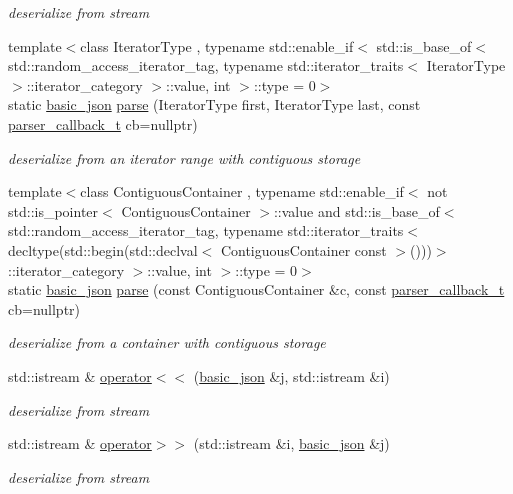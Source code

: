 \begin{DoxyCompactItemize}
\begin{DoxyCompactList}\small\item\em deserialize from stream \end{DoxyCompactList}\item 
{\footnotesize template$<$class Iterator\+Type , typename std\+::enable\+\_\+if$<$ std\+::is\+\_\+base\+\_\+of$<$ std\+::random\+\_\+access\+\_\+iterator\+\_\+tag, typename std\+::iterator\+\_\+traits$<$ Iterator\+Type $>$\+::iterator\+\_\+category $>$\+::value, int $>$\+::type  = 0$>$ }\\static \hyperlink{classnlohmann_1_1basic__json}{basic\+\_\+json} \hyperlink{classnlohmann_1_1basic__json_aa8dca2e91a6301c36890f844e64f0023}{parse} (Iterator\+Type first, Iterator\+Type last, const \hyperlink{classnlohmann_1_1basic__json_a9e35475e2027520a78e09f460dbe048a}{parser\+\_\+callback\+\_\+t} cb=nullptr)
\begin{DoxyCompactList}\small\item\em deserialize from an iterator range with contiguous storage \end{DoxyCompactList}\item 
{\footnotesize template$<$class Contiguous\+Container , typename std\+::enable\+\_\+if$<$ not std\+::is\+\_\+pointer$<$ Contiguous\+Container $>$\+::value and std\+::is\+\_\+base\+\_\+of$<$ std\+::random\+\_\+access\+\_\+iterator\+\_\+tag, typename std\+::iterator\+\_\+traits$<$ decltype(std\+::begin(std\+::declval$<$ Contiguous\+Container const $>$()))$>$\+::iterator\+\_\+category $>$\+::value, int $>$\+::type  = 0$>$ }\\static \hyperlink{classnlohmann_1_1basic__json}{basic\+\_\+json} \hyperlink{classnlohmann_1_1basic__json_aeffd70f622f8f2a51fd3d95af64b63a7}{parse} (const Contiguous\+Container \&c, const \hyperlink{classnlohmann_1_1basic__json_a9e35475e2027520a78e09f460dbe048a}{parser\+\_\+callback\+\_\+t} cb=nullptr)
\begin{DoxyCompactList}\small\item\em deserialize from a container with contiguous storage \end{DoxyCompactList}\item 
std\+::istream \& \hyperlink{classnlohmann_1_1basic__json_a60ca396028b8d9714c6e10efbf475af6}{operator$<$$<$} (\hyperlink{classnlohmann_1_1basic__json}{basic\+\_\+json} \&j, std\+::istream \&i)
\begin{DoxyCompactList}\small\item\em deserialize from stream \end{DoxyCompactList}\item 
std\+::istream \& \hyperlink{classnlohmann_1_1basic__json_aaf363408931d76472ded14017e59c9e8}{operator$>$$>$} (std\+::istream \&i, \hyperlink{classnlohmann_1_1basic__json}{basic\+\_\+json} \&j)
\begin{DoxyCompactList}\small\item\em deserialize from stream \end{DoxyCompactList}\end{DoxyCompactItemize}

